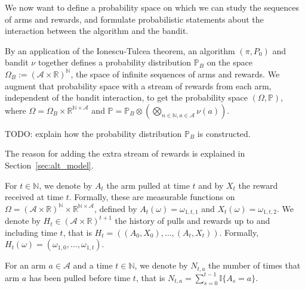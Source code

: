 We now want to define a probability space on which we can study the sequences of arms and rewards, and formulate probabilistic statements about the interaction between the algorithm and the bandit.


\begin{definition}\label{def:Bandit.measure}
  \leanok
By an application of the Ionescu-Tulcea theorem, an algorithm $(\pi, P_0)$ and bandit $\nu$ together defines a probability distribution $\mathbb{P}_B$ on the space $\Omega_B := (\mathcal{A} \times \mathbb{R})^{\mathbb{N}}$, the space of infinite sequences of arms and rewards.
We augment that probability space with a stream of rewards from each arm, independent of the bandit interaction, to get the probability space $(\Omega, \mathbb{P})$, where $\Omega = \Omega_B \times \mathbb{R}^{\mathbb{N} \times \mathcal{A}}$ and $\mathbb{P} = \mathbb{P}_B \otimes (\bigotimes_{n \in \mathbb{N}, a \in \mathcal{A}} \nu(a))$.

TODO: explain how the probability distribution $\mathbb{P}_B$ is constructed.
\end{definition}

The reason for adding the extra stream of rewards is explained in Section~\ref{sec:alt_model}.

\begin{definition}\label{def:armAndReward}
  \leanok
For $t \in \mathbb{N}$, we denote by $A_t$ the arm pulled at time $t$ and by $X_t$ the reward received at time $t$.
Formally, these are measurable functions on $\Omega = (\mathcal{A} \times \mathbb{R})^{\mathbb{N}} \times \mathbb{R}^{\mathbb{N} \times \mathcal{A}}$, defined by $A_t(\omega) = \omega_{1,t,1}$ and $X_t(\omega) = \omega_{1,t,2}$.
We denote by $H_t \in (\mathcal{A} \times \mathbb{R})^{t+1}$ the history of pulls and rewards up to and including time $t$, that is $H_t = ((A_0, X_0), \ldots, (A_t, X_t))$.
Formally, $H_t(\omega) = (\omega_{1,0}, \ldots, \omega_{1,t})$.
\end{definition}


\begin{definition}\label{def:pullCount}
  \leanok
For an arm $a \in \mathcal{A}$ and a time $t \in \mathbb{N}$, we denote by $N_{t,a}$ the number of times that arm $a$ has been pulled before time $t$, that is $N_{t,a} = \sum_{s=0}^{t-1} \mathbb{I}\{A_s = a\}$.
\end{definition}


